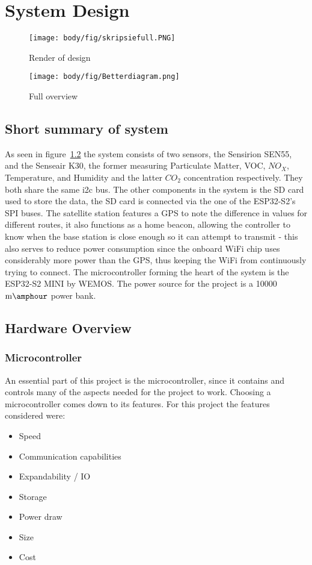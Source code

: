 \chapter{System Design}
\vspace{-5em}

\begin{figure}[!htb]
	\centering
	\texttt{[image: body/fig/skripsiefull.PNG]}
	\caption{Render of design  }
	\label{fig:render}
\end{figure}
\vspace{-2em}
\begin{figure}[!htb]
	\centering
	\texttt{[image: body/fig/Betterdiagram.png]}
	\caption{ Full overview}
	\label{fig:fulldrawio}
\end{figure}
\vspace{-2em}
\section{Short summary of system}
As seen in figure~\ref{fig:fulldrawio} the system consists of two sensors, the Sensirion SEN55, and the Senseair K30, the former measuring Particulate Matter, VOC, $NO_X$, Temperature, and Humidity and the latter $CO_2$ concentration respectively. They both share the same i2c bus. The other components in the system is the SD card used to store the data, the SD card is connected via the one of the ESP32-S2's SPI buses. The satellite station features a GPS to note the difference in values for different routes, it also functions as a home beacon, allowing the controller to know when the base station is close enough so it can attempt to transmit - this also serves to reduce power consumption since the onboard WiFi chip uses considerably more power than the GPS, thus keeping the WiFi from continuously trying to connect. The microcontroller forming the heart of the system is the ESP32-S2 MINI by WEMOS. The power source for the project is a 10000$ \si{\milli\amphour} $ power bank.

\section{Hardware Overview}


\subsection{Microcontroller}
An essential part of this project is the microcontroller, since it contains and controls many of the aspects needed for the project to work.
Choosing a microcontroller comes down to its features. For this project the features considered were:
\begin{itemize}
	\item Speed
	\item Communication capabilities
	\item Expandability / IO
	\item Storage
	\item Power draw
	\item Size
	\item Cost
\end{itemize}


